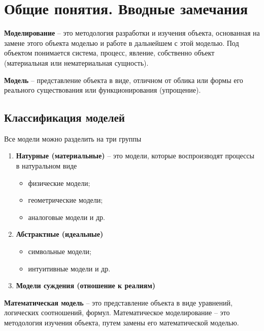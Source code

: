 \chapter{Общие понятия. Вводные замечания}

\textbf{Моделирование} -- это методология разработки
и изучения объекта, основанная на замене этого объекта моделью
и работе в дальнейшем с этой моделью.
Под объектом понимается система, процесс, явление, собственно
объект (материальная или нематериальная сущность).

\textbf{Модель} -- представление объекта в виде, отличном от облика
или формы его реального существования или функционирования
(упрощение).

\section{Классификация моделей}

Все модели можно разделить на три группы

\begin{enumerate}
    \item \textbf{Натурные (материальные)} --
        это модели, которые воспроизводят процессы в натуральном виде

        \begin{itemize}
            \item физические модели;
            \item геометрические модели;
            \item аналоговые модели и др.
        \end{itemize}

    \item \textbf{Абстрактные (идеальные)}

        \begin{itemize}
            \item символьные модели;
            \item интуитивные модели и др.
        \end{itemize}

    \item \textbf{Модели суждения (отношение к реалиям)}
\end{enumerate}

\textbf{Математическая модель} -- это представление объекта
в виде уравнений, логических соотношений, формул. Математическое
моделирование -- это методология изучения объекта, путем замены
его математической моделью.

